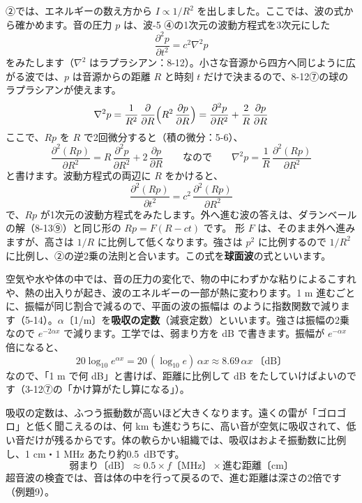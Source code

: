 ②では、エネルギーの数え方から $I\propto1/R^2$ を出しました。ここでは、波の式から確かめます。音の圧力 $p$ は、波-5 ④の1次元の波動方程式を3次元にした
\[\frac{\partial^2p}{\partial t^2}=c^2\nabla^2p\]
をみたします（$\nabla^2$ はラプラシアン：8-12）。小さな音源から四方へ同じように広がる波では、$p$ は音源からの距離 $R$ と時刻 $t$ だけで決まるので、8-12⑦の球のラプラシアンが使えます。
\[\nabla^2p=\frac{1}{R^2}\,\frac{\partial}{\partial R}\Bigl(R^2\,\frac{\partial p}{\partial R}\Bigr)=\frac{\partial^2p}{\partial R^2}+\frac{2}{R}\,\frac{\partial p}{\partial R}\]
ここで、$Rp$ を $R$ で2回微分すると（積の微分：5-6）、
\[\frac{\partial^2(Rp)}{\partial R^2}=R\,\frac{\partial^2p}{\partial R^2}+2\,\frac{\partial p}{\partial R}\qquad\text{なので}\qquad\nabla^2p=\frac1R\,\frac{\partial^2(Rp)}{\partial R^2}\]
と書けます。波動方程式の両辺に $R$ をかけると、
\[\frac{\partial^2(Rp)}{\partial t^2}=c^2\,\frac{\partial^2(Rp)}{\partial R^2}\]
で、$Rp$ が1次元の波動方程式をみたします。外へ進む波の答えは、ダランベールの解（8-13⑨）と同じ形の $Rp=F(R-ct)$ です。
\label{ph:波-7:kyumenha}形 $F$ は、そのまま外へ進みますが、高さは $1/R$ に比例して低くなります。強さは $p^2$ に比例するので $1/R^2$ に比例し、②の逆2乗の法則と合います。この式を\textbf{球面波}の式といいます。

空気や水や体の中では、音の圧力の変化で、物の中にわずかな粘りによるこすれや、熱の出入りが起き、波のエネルギーの一部が熱に変わります。1 m 進むごとに、振幅が同じ割合で減るので、平面の波の振幅は
のように指数関数で減ります（5-14）。$\alpha$〔1/m〕を\textbf{吸収の定数}（減衰定数）といいます。強さは振幅の2乗なので $e^{-2\alpha x}$ で減ります。工学では、弱まり方を dB で書きます。振幅が $e^{-\alpha x}$ 倍になると、
\[20\log_{10}e^{\alpha x}=20\,(\log_{10}e)\,\alpha x\approx8.69\,\alpha x\ \text{〔dB〕}\]
なので、「1 m で何 dB」と書けば、距離に比例して dB をたしていけばよいのです（3-12⑦の「かけ算がたし算になる」）。

吸収の定数は、ふつう振動数が高いほど大きくなります。遠くの雷が「ゴロゴロ」と低く聞こえるのは、何 km も進むうちに、高い音が空気に吸収されて、低い音だけが残るからです。体の軟らかい組織では、吸収はおよそ振動数に比例し、1 cm・1 MHz あたり約\qty{0.5}{dB}です。
\[\text{弱まり〔dB〕}\approx0.5\times f\text{〔MHz〕}\times\text{進む距離〔cm〕}\]
超音波の検査では、音は体の中を行って戻るので、進む距離は深さの2倍です（例題9）。

